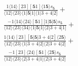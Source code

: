 \documentclass[varwidth, border=5pt]{standalone}
\begin{document}
\begin{my}
$\begin{gathered}
\scriptscriptstyle\frac{1⟨14⟩[23][𝟓1]⟨1𝟓⟩s_{𝟓}}{⟨12⟩⟨23⟩⟨1|𝟓|1]⟨1|3+4|2]} +\\
\scriptscriptstyle\frac{-1⟨14⟩⟨24⟩[𝟓1][1|𝟓|𝟓⟩s_{𝟓}}{⟨12⟩⟨23⟩⟨34⟩⟨1|𝟓|1]⟨2|3+4|1]} +\\
\scriptscriptstyle\frac{1⟨14⟩[23][𝟓|𝟓|3+4|2]⟨2𝟓⟩}{⟨12⟩⟨23⟩⟨1|3+4|2]⟨2|3+4|2]} +\\
\scriptscriptstyle\frac{-1[23]⟨24⟩[𝟓1]⟨2𝟓⟩s_{𝟓}}{⟨12⟩⟨23⟩⟨2|3+4|1]⟨2|3+4|2]} \phantom{+}
\end{gathered}$
\end{my}
\end{document}
